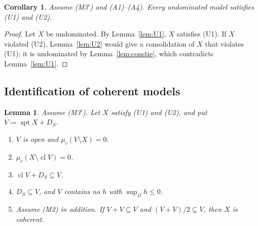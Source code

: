 \documentclass[11pt]{article}
\DeclareMathOperator{\cl}{cl}
\DeclareMathOperator{\spt}{spt}
\theoremstyle{plain}
\newtheorem{lemma}[theorem]{Lemma}
\newtheorem{corollary}[theorem]{Corollary}
\theoremstyle{definition}
\theoremstyle{remark}
\begin{document}
\begin{corollary}\label{cor:U}
Assume (M3$'$) and (A1)--(A4). Every undominated model satisfies (U1) and (U2).
\end{corollary}

\begin{proof}
Let $X$ be undominated. By Lemma~\ref{lem:U1}, $X$ satisfies (U1). If $X$ violated (U2),
Lemma~\ref{lem:U2} would give a consolidation of $X$ that violates (U1); it is undominated by
Lemma~\ref{lem:constie}, which contradicts Lemma~\ref{lem:U1}.
\end{proof}

\subsection{Identification of coherent models}

\begin{lemma}\label{lem:open}
Assume (M3$'$). Let $X$ satisfy (U1) and (U2), and put $V\coloneqq\spt X+D_S$.
\begin{enumerate}[label=(\alph*)]
  \item $V$ is open and $\mu_c(V\setminus X)=0$.
  \item $\mu_c(X\setminus\cl V)=0$.
  \item $\cl V+D_S\subseteq V$.
  \item $D_S\subseteq V$, and $V$ contains no $h$ with $\sup_\Omega h\le0$.
  \item Assume (M2) in addition. If $V+V\subseteq V$ and $(V+V)/2\subseteq V$, then $X$ is
  coherent.
\end{enumerate}
\end{lemma}
\end{document}
